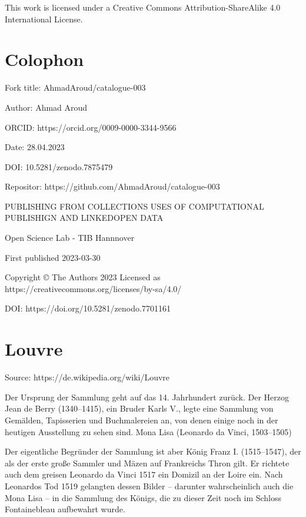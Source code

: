 \documentclass[
  letterpaper,
]{book}
\begin{document}
This work is licensed under a Creative Commons Attribution-ShareAlike
4.0 International License.


\hypertarget{colophon}{%
\chapter{Colophon}\label{colophon}}

Fork title: AhmadAroud/catalogue-003

Author: Ahmad Aroud

ORCID: https://orcid.org/0009-0000-3344-9566

Date: 28.04.2023

DOI: 10.5281/zenodo.7875479

Repositor: https://github.com/AhmadAroud/catalogue-003

PUBLISHING FROM COLLECTIONS USES OF COMPUTATIONAL PUBLISHIGN AND
LINKEDOPEN DATA

Open Science Lab - TIB Hannnover

First published 2023-03-30

Copyright © The Authors 2023 Licensed as
https://creativecommons.org/licenses/by-sa/4.0/

DOI: https://doi.org/10.5281/zenodo.7701161


\hypertarget{louvre}{%
\chapter{Louvre}\label{louvre}}

Source: https://de.wikipedia.org/wiki/Louvre

Der Ursprung der Sammlung geht auf das 14. Jahrhundert zurück. Der
Herzog Jean de Berry (1340--1415), ein Bruder Karls V., legte eine
Sammlung von Gemälden, Tapisserien und Buchmalereien an, von denen
einige noch in der heutigen Ausstellung zu sehen sind. Mona Lisa
(Leonardo da Vinci, 1503--1505)

Der eigentliche Begründer der Sammlung ist aber König Franz I.
(1515--1547), der als der erste große Sammler und Mäzen auf Frankreichs
Thron gilt. Er richtete auch dem greisen Leonardo da Vinci 1517 ein
Domizil an der Loire ein. Nach Leonardos Tod 1519 gelangten dessen
Bilder -- darunter wahrscheinlich auch die Mona Lisa -- in die Sammlung
des Königs, die zu dieser Zeit noch im Schloss Fontainebleau aufbewahrt
wurde.
\end{document}

